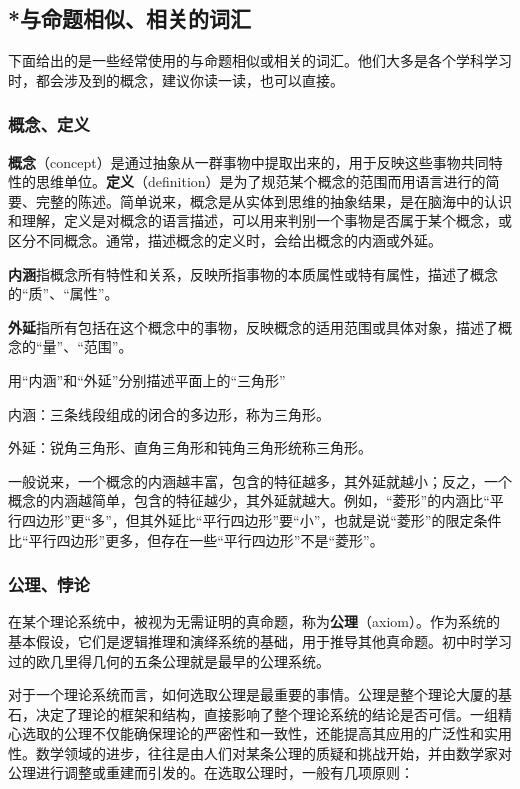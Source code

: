 \subsection{*与命题相似、相关的词汇}

下面给出的是一些经常使用的与命题相似或相关的词汇。他们大多是各个学科学习时，都会涉及到的概念，建议你读一读，也可以直接。

\subsubsection{概念、定义}

\textbf{概念}（concept）是通过抽象从一群事物中提取出来的，用于反映这些事物共同特性的思维单位。\textbf{定义}（definition）是为了规范某个概念的范围而用语言进行的简要、完整的陈述。简单说来，概念是从实体到思维的抽象结果，是在脑海中的认识和理解，定义是对概念的语言描述，可以用来判别一个事物是否属于某个概念，或区分不同概念。通常，描述概念的定义时，会给出概念的内涵或外延。

\textbf{内涵}指概念所有特性和关系，反映所指事物的本质属性或特有属性，描述了概念的“质”、“属性”。

\textbf{外延}指所有包括在这个概念中的事物，反映概念的适用范围或具体对象，描述了概念的“量”、“范围”。

\begin{example}{用“内涵”和“外延”分别描述平面上的“三角形”}

内涵：三条线段组成的闭合的多边形，称为三角形。

外延：锐角三角形、直角三角形和钝角三角形统称三角形。

\end{example}

一般说来，一个概念的内涵越丰富，包含的特征越多，其外延就越小；反之，一个概念的内涵越简单，包含的特征越少，其外延就越大。例如，“菱形”的内涵比“平行四边形”更“多”，但其外延比“平行四边形”要“小”，也就是说“菱形”的限定条件比“平行四边形”更多，但存在一些“平行四边形”不是“菱形”。

\subsubsection{公理、悖论}

在某个理论系统中，被视为无需证明的真命题，称为\textbf{公理}（axiom）。作为系统的基本假设，它们是逻辑推理和演绎系统的基础，用于推导其他真命题。初中时学习过的欧几里得几何的五条公理就是最早的公理系统。

对于一个理论系统而言，如何选取公理是最重要的事情。公理是整个理论大厦的基石，决定了理论的框架和结构，直接影响了整个理论系统的结论是否可信。一组精心选取的公理不仅能确保理论的严密性和一致性，还能提高其应用的广泛性和实用性。数学领域的进步，往往是由人们对某条公理的质疑和挑战开始，并由数学家对公理进行调整或重建而引发的。在选取公理时，一般有几项原则：

